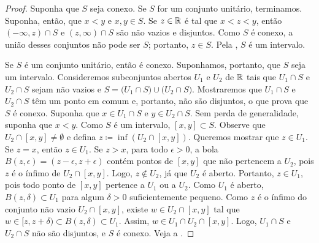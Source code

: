 \begin{proof}
Suponha que $S$ seja conexo. Se $S$ for um conjunto unitário, terminamos.
Suponha, então, que $x < y$ e $x,y \in S$. Se $z \in {\mathbb{R}}$ é tal que
$x < z < y$, então $(-\infty,z) \cap S$ e $(z,\infty) \cap S$ são não vazios
e disjuntos. Como $S$ é conexo, a união desses conjuntos não pode ser $S$;
portanto, $z \in S$.
Pela , $S$ é um intervalo.

Se $S$ é um conjunto unitário, então é conexo.
Suponhamos, portanto, que $S$ seja um intervalo.
Consideremos subconjuntos abertos $U_1$ e $U_2$ de ${\mathbb{R}}$ tais que
$U_1 \cap S$ e $U_2 \cap S$ sejam não vazios e
$S = 
\bigl( U_1 \cap S \bigr)
\cup
\bigl( U_2 \cap S \bigr)$. Mostraremos que $U_1 \cap S$
e $U_2 \cap S$ têm um ponto em comum e, portanto, não são disjuntos,
o que prova que $S$ é conexo.
Suponha que $x \in U_1 \cap S$ e $y \in U_2 \cap S$.
Sem perda de generalidade, suponha que $x < y$.
Como $S$ é um intervalo, $[x,y] \subset S$.
Observe que $U_2 \cap [x,y] \neq \emptyset$ e defina
$z \coloneqq \inf (U_2 \cap [x,y])$.
Queremos mostrar que $z \in U_1$.
Se $z = x$, então $z \in U_1$.
Se $z > x$, para todo $\epsilon > 0$, a bola
$B(z,\epsilon) = (z-\epsilon,z+\epsilon)$ contém pontos de $[x,y]$ que não
pertencem a $U_2$, pois $z$ é o ínfimo de $U_2 \cap [x,y]$.
Logo, $z \notin U_2$, já que $U_2$ é aberto.
Portanto, $z \in U_1$, pois todo ponto de $[x,y]$ pertence a $U_1$ ou a
$U_2$.
Como $U_1$ é aberto, $B(z,\delta) \subset U_1$ para algum $\delta > 0$
suficientemente pequeno.
Como $z$ é o ínfimo do conjunto não vazio $U_2 \cap [x,y]$, existe
$w \in U_2 \cap [x,y]$ tal que $w \in [z,z+\delta) \subset B(z,\delta)
\subset U_1$.
Assim, $w \in U_1 \cap U_2 \cap [x,y]$.
Logo, $U_1 \cap S$ e $U_2 \cap S$ não são disjuntos, e $S$ é conexo.
Veja a .
\end{proof}

\begin{myfigureht}
\caption{Demonstração de que um intervalo é conexo.\label{fig:intervalcon}}
\end{myfigureht}

